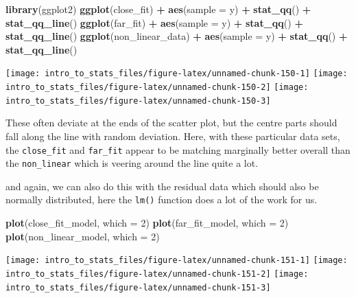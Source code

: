 \documentclass[
]{book}
\newenvironment{Shaded}{\begin{snugshade}}{\end{snugshade}}
\newcommand{\DataTypeTok}[1]{\textcolor[rgb]{0.13,0.29,0.53}{#1}}
\newcommand{\DecValTok}[1]{\textcolor[rgb]{0.00,0.00,0.81}{#1}}
\newcommand{\KeywordTok}[1]{\textcolor[rgb]{0.13,0.29,0.53}{\textbf{#1}}}
\newcommand{\NormalTok}[1]{#1}
\newcommand{\OperatorTok}[1]{\textcolor[rgb]{0.81,0.36,0.00}{\textbf{#1}}}
\newcommand{\StringTok}[1]{\textcolor[rgb]{0.31,0.60,0.02}{#1}}
\begin{document}
\begin{Shaded}
\begin{Highlighting}[]
\KeywordTok{library}\NormalTok{(ggplot2)}
\KeywordTok{ggplot}\NormalTok{(close_fit) }\OperatorTok{+}\StringTok{ }\KeywordTok{aes}\NormalTok{(}\DataTypeTok{sample =}\NormalTok{ y) }\OperatorTok{+}\StringTok{ }\KeywordTok{stat_qq}\NormalTok{() }\OperatorTok{+}\StringTok{ }\KeywordTok{stat_qq_line}\NormalTok{()}
\KeywordTok{ggplot}\NormalTok{(far_fit) }\OperatorTok{+}\StringTok{ }\KeywordTok{aes}\NormalTok{(}\DataTypeTok{sample =}\NormalTok{ y) }\OperatorTok{+}\StringTok{ }\KeywordTok{stat_qq}\NormalTok{() }\OperatorTok{+}\StringTok{ }\KeywordTok{stat_qq_line}\NormalTok{()}
\KeywordTok{ggplot}\NormalTok{(non_linear_data) }\OperatorTok{+}\StringTok{ }\KeywordTok{aes}\NormalTok{(}\DataTypeTok{sample =}\NormalTok{ y) }\OperatorTok{+}\StringTok{ }\KeywordTok{stat_qq}\NormalTok{() }\OperatorTok{+}\StringTok{ }\KeywordTok{stat_qq_line}\NormalTok{()}
\end{Highlighting}
\end{Shaded}

\texttt{[image: intro\_to\_stats\_files/figure-latex/unnamed-chunk-150-1]} \texttt{[image: intro\_to\_stats\_files/figure-latex/unnamed-chunk-150-2]} \texttt{[image: intro\_to\_stats\_files/figure-latex/unnamed-chunk-150-3]}

These often deviate at the ends of the scatter plot, but the centre parts should fall along the line with random deviation. Here, with these particular data sets, the \texttt{close\_fit} and \texttt{far\_fit} appear to be matching marginally better overall than the \texttt{non\_linear} which is veering around the line quite a lot.

and again, we can also do this with the residual data which should also be normally distributed, here the \texttt{lm()} function does a lot of the work for us.

\begin{Shaded}
\begin{Highlighting}[]
\KeywordTok{plot}\NormalTok{(close_fit_model, }\DataTypeTok{which =} \DecValTok{2}\NormalTok{)}
\KeywordTok{plot}\NormalTok{(far_fit_model, }\DataTypeTok{which =} \DecValTok{2}\NormalTok{)}
\KeywordTok{plot}\NormalTok{(non_linear_model, }\DataTypeTok{which =} \DecValTok{2}\NormalTok{)}
\end{Highlighting}
\end{Shaded}

\texttt{[image: intro\_to\_stats\_files/figure-latex/unnamed-chunk-151-1]} \texttt{[image: intro\_to\_stats\_files/figure-latex/unnamed-chunk-151-2]} \texttt{[image: intro\_to\_stats\_files/figure-latex/unnamed-chunk-151-3]}
\end{document}
